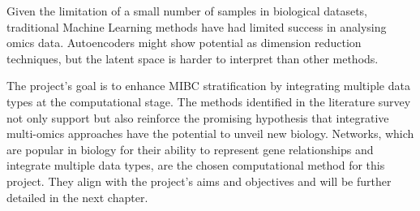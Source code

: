 Given the limitation of a small number of samples in biological datasets, traditional Machine Learning methods have had limited success in analysing omics data. Autoencoders might show potential as dimension reduction techniques, but the latent space is harder to interpret than other methods.

The project's goal is to enhance MIBC stratification by integrating multiple data types at the computational stage. The methods identified in the literature survey not only support but also reinforce the promising hypothesis that integrative multi-omics approaches have the potential to unveil new biology. Networks, which are popular in biology for their ability to represent gene relationships and integrate multiple data types, are the chosen computational method for this project. They align with the project's aims and objectives and will be further detailed in the next chapter.